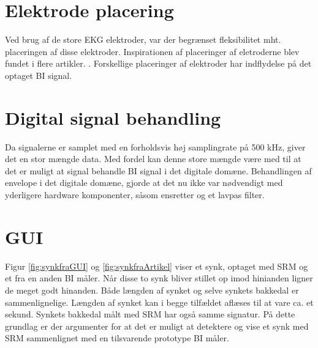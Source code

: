 \section{Elektrode placering}
Ved brug af de store EKG elektroder, var der begrænset fleksibilitet mht. placeringen af disse elektroder. Inspirationen af placeringer af eletroderne blev fundet i flere artikler.\cite{Chester}
\cite{Schultheiss2013}. Forskellige placeringer af elektroder har indflydelse på det optaget BI signal\cite{Yamamoto2000}.  



\section{Digital signal behandling}
Da signalerne er samplet med en forholdsvis høj samplingrate på 500 kHz, giver det en stor mængde data. Med fordel kan denne store mængde være med til at det er muligt at signal behandle BI signal i det digitale domæne.
Behandlingen af envelope i det digitale domæne, gjorde at det nu ikke var nødvendigt med yderligere hardware komponenter, såsom ensretter og et lavpas filter.

\section{GUI}

Figur \ref{fig:synkfraGUI} og \ref{fig:synkfraArtikel} viser et synk, optaget med SRM og et fra en anden BI måler. Når disse to synk bliver stillet op imod hinianden ligner de meget godt hinanden. Både længden af synket og selve synkets bakkedal er sammenlignelige. Længden af synket kan i begge tilfældet aflæses til at vare ca. et sekund. Synkets bakkedal målt med SRM har også samme signatur. På dette grundlag er der argumenter for at det er muligt at detektere og vise et synk med SRM sammenlignet med en tilsvarende prototype BI måler.

